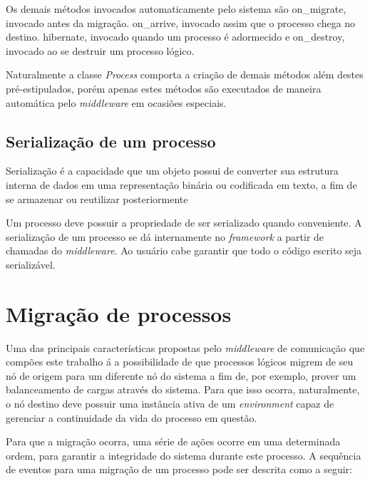Os demais métodos invocados automaticamente pelo sistema são on\_migrate, invocado antes da migração. on\_arrive, invocado assim que o processo chega no destino. hibernate, invocado quando um processo é adormecido e on\_destroy, invocado ao se destruir um processo lógico.

Naturalmente a classe \textit{Process} comporta a criação de demais métodos além destes pré-estipulados, porém apenas estes métodos são executados de maneira automática pelo \textit{middleware} em ocasiões especiais.

\subsection{Serialização de um processo}

Serialização é a capacidade que um objeto possui de converter sua estrutura interna de dados em uma representação binária ou codificada em texto, a fim de se armazenar ou reutilizar posteriormente

Um processo deve possuir a propriedade de ser serializado quando conveniente. A serialização de um processo se dá internamente no \textit{framework} a partir de chamadas do \textit{middleware}. Ao usuário cabe garantir que todo o código escrito seja serializável.

\section{Migração de processos \label{migracao}}

Uma das principais características propostas pelo \textit{middleware} de comunicação que compões este trabalho á a possibilidade de que processos lógicos migrem de seu nó de origem para um diferente nó do sistema a fim de, por exemplo, prover um balanceamento de cargas através do sistema. Para que isso ocorra, naturalmente, o nó destino deve possuir uma instância ativa de um \textit{environment} capaz de gerenciar a continuidade da vida do processo em questão.

Para que a migração ocorra, uma série de ações ocorre em uma determinada ordem, para garantir a integridade do sistema durante este processo. A sequência de eventos para uma migração de um processo pode ser descrita como a seguir:

